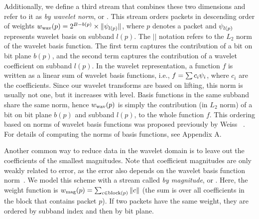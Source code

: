 Additionally, we define a third stream that combines these two dimensions and refer to it as
\emph{by wavelet norm}, or \swav. This stream orders packets in descending order of weights
$\wwav(p)=2^{B-b(p)}\times \| \wbas_{l(p)} \|$, where $p$ denotes a packet and $\wbas_{l(p)}$
represents wavelet basis on subband $l(p)$. The $||$ notation refers to the $L_2$ norm of the
wavelet basis function. The first term captures the contribution of a bit on bit plane $b(p)$, and
the second term captures the contribution of a wavelet coefficient on subband $l(p)$.
%
%
In the wavelet representation, a function $f$ is written as a linear sum of wavelet basis functions,
i.e., $f=\sum{c_i\wbas_i}$, where $c_i$ are the coefficients. Since our wavelet transforms are based
on lifting, this norm is usually not one, but it increases with level. Basis functions in the same
subband share the same norm, hence $\wwav(p)$ is simply the contribution (in $L_2$ norm) of a bit on
bit plane $b(p)$ and subband $l(p)$, to the whole function $f$. This ordering based on norms of
wavelet basis functions was proposed previously by Weiss \etal~\cite{weiss}. For details of
computing the norms of basis functions, see Appendix A.

Another common way to reduce data in the wavelet domain is to leave out the coefficients of the
smallest magnitudes. Note that coefficient magnitudes are only weakly related to error, as the error
also depends on the wavelet basis function norm~\cite{weiss}. We model this scheme with a stream
called \emph{by magnitude}, or \smag. Here, the weight function is $\wmag(p)=\sum_{c\in
\text{block}(p)}\norm{c}$ (the sum is over all coefficients in the block that contains packet $p$).
If two packets have the same weight, they are ordered by subband index and then by bit plane.

